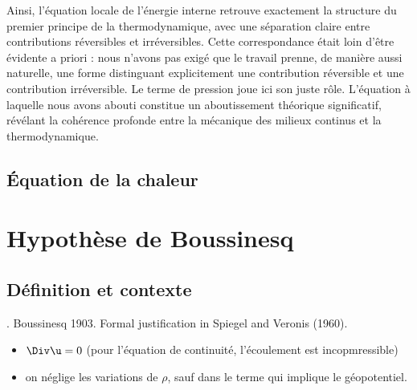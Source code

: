 Ainsi, l’équation locale de l’énergie interne retrouve exactement la structure du premier principe de la thermodynamique, avec une séparation claire entre contributions réversibles et irréversibles. Cette correspondance était loin d’être évidente a priori : nous n’avons pas exigé que le travail prenne, de manière aussi naturelle, une forme distinguant explicitement une contribution réversible et une contribution irréversible. Le terme de pression joue ici son juste rôle. L’équation à laquelle nous avons abouti constitue un aboutissement théorique significatif, révélant la cohérence profonde entre la mécanique des milieux continus et la thermodynamique.





\subsection{Équation de la chaleur}



\section{Hypothèse de Boussinesq}

\subsection{Définition et contexte}

\cite[sect 4.18,  p. 108]{kundu04aa}. Boussinesq 1903. Formal justification in Spiegel and Veronis (1960). 

\begin{itemize}
  \item $\Div \u = 0$ (pour l'équation de continuité, l'écoulement est incopmressible)
  \item on néglige les variations de $\rho$, sauf dans le terme qui implique le géopotentiel. 
\end{itemize}




